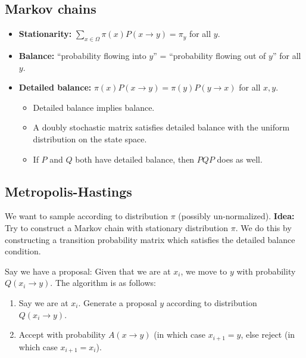\documentclass[twoside]{article}
\newcommand{\dis}{\displaystyle}
\newcommand\Om{\Omega}
\newcommand\goesto{\rightarrow}
\begin{document}
\subsection*{Markov chains}
\begin{itemize}
\item \textbf{Stationarity:} $\dis\sum_{x \in \Om} \pi(x) P(x \goesto y) = \pi_y$ for all $y$.

\item \textbf{Balance:} ``probability flowing into $y$'' = ``probability flowing out of $y$'' for all $y$.
\item \textbf{Detailed balance:} $\pi(x) P(x \goesto y) = \pi(y) P(y \goesto x)$ for all $x, y$.
\begin{itemize}
\item Detailed balance implies balance.

\item A doubly stochastic matrix satisfies detailed balance with the uniform distribution on the state space.

\item If $P$ and $Q$ both have detailed balance, then $PQP$ does as well.
\end{itemize}

\end{itemize}

\subsection*{Metropolis-Hastings}
We want to sample according to distribution $\pi$ (possibly un-normalized). \textbf{Idea:} Try to construct a Markov chain with stationary distribution $\pi$. We do this by constructing a transition probability matrix which satisfies the detailed balance condition.

Say we have a proposal: Given that we are at $x_i$, we move to $y$ with probability $Q (x_i \goesto y)$. The algorithm is as follows:
\begin{enumerate}
\item Say we are at $x_i$. Generate a proposal $y$ according to distribution $Q(x_i \goesto y)$.
\item Accept with probability $A(x \goesto y)$ (in which case $x_{i+1} = y$, else reject (in which case $x_{i+1} = x_i$).
\end{enumerate}
\end{document}
